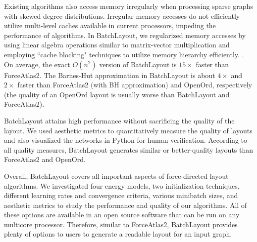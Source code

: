 \documentclass{vgtc}
\newcommand{\commentKhaled}[1]{{\color{black}{#1}}}
\begin{document}
Existing algorithms also access memory irregularly when processing sparse graphs with skewed degree distributions.
Irregular memory accesses do not efficiently utilize multi-level caches available in current processors, impeding the performance of algorithms.       
In BatchLayout, we regularized memory accesses by using linear algebra operations similar to matrix-vector multiplication and employing  ``cache blocking" techniques to utilize memory hierarchy efficiently.  
\commentKhaled{More parallelism and better memory accesses made BatchLayout faster than existing  parallel force-directed algorithms}. 
On average, the exact $O(n^2)$ version of BatchLayout is $15\times$ faster than ForceAtlas2.
The Barnes-Hut approximation in BatchLayout is about $4\times$ and $2\times$ faster than ForceAtlas2 (with BH approximation) and OpenOrd, respectively (the quality of an OpenOrd layout is usually worse than BatchLayout and ForceAtlas2).

BatchLayout attains high performance without sacrificing the quality of the layout. 
We used \commentKhaled{three} aesthetic metrics to quantitatively measure the quality of layouts and also visualized the networks in Python for human verification. 
According to all quality measures, BatchLayout generates similar or better-quality layouts than ForceAtlas2 and OpenOrd.


Overall, BatchLayout covers all important aspects of force-directed layout algorithms. 
We investigated four energy models, two initialization techniques, different learning rates and convergence criteria, various minibatch sizes, and \commentKhaled{three} aesthetic metrics to study the performance and quality of our algorithms.
All of these options are available in an open source software that can be run on any multicore processor.  
Therefore, similar to ForceAtlas2, BatchLayout provides plenty of options to users to generate a readable layout for an input graph. 
\end{document}
